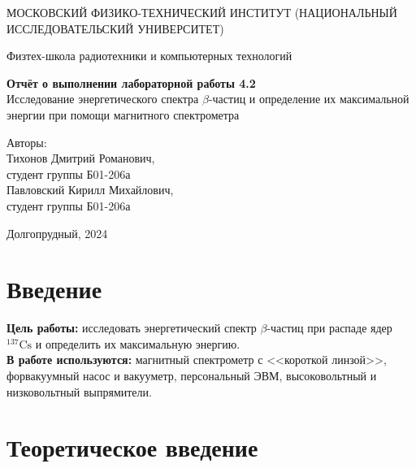 \documentclass[a4paper, 12pt]{article}
\newcommand{\elem}[3]{{}^{#2}_{#3}\text{#1}}
\newcommand{\Cs}{\elem{Cs}{137}{}}
\begin{document}
    \begin{titlepage}
	\begin{center}
            {\large МОСКОВСКИЙ ФИЗИКО-ТЕХНИЧЕСКИЙ ИНСТИТУТ (НАЦИОНАЛЬНЫЙ ИССЛЕДОВАТЕЛЬСКИЙ УНИВЕРСИТЕТ)}
	\end{center}
 
	\begin{center}
		{\large Физтех-школа радиотехники и компьютерных технологий}
	\end{center}
	
	\vspace{8cm}
	{\LARGE
		\begin{center}
                {\bf Отчёт о выполнении лабораторной работы 4.2}\\
                Исследование энергетического спектра $\beta$-частиц и определение их максимальной энергии при помощи магнитного спектрометра
		\end{center}
	}
	\vspace{3 cm}
	\begin{flushright}
		{\Large Авторы: \\ 
        Тихонов Дмитрий Романович, \\ студент группы Б01-206а \\
        Павловский Кирилл Михайлович, \\ студент группы Б01-206а}
	\end{flushright}
	\vspace{4cm}
	\begin{center}
		\Large Долгопрудный, 2024
	\end{center}
    \end{titlepage}


    \section{Введение}

    \noindent \textbf{Цель работы:} исследовать энергетический спектр $\beta$-частиц при распаде ядер $\Cs$ и определить их максимальную энергию. \\
	
    \noindent \textbf{В работе используются:} магнитный спектрометр с <<короткой линзой>>, форвакуумный насос и вакууметр, персональный ЭВМ, высоковольтный и низковольтный выпрямители.
    
    \section{Теоретическое введение}
\end{document}

